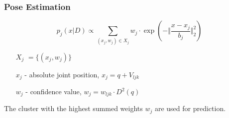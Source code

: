 \documentclass[xcolor=dvipsnames]{beamer}
\begin{document}
\begin{frame}
	\frametitle{Pose Estimation}

	\begin{equation*}
		p_j(x | D) \propto \sum\limits_{(x_j, w_j) \in X_j}^{} w_{j} \cdot \exp(- \Vert \frac{x - x_j}{b_j} \Vert^2_2)
	\end{equation*}
	
	\vspace{1cm}

	\begin{itemize}
		\item[$X_j$]$= \{(x_j, w_j)\}$
		\item[]
		\item[$x_j$ - ] absolute joint position, $x_j = q + V_{ljk}$
		\item[$w_j$ - ] confidence value, $w_j = w_{ljk} \cdot D^2(q)$
	\end{itemize}
	
	\vspace{0.5cm}
	
	The cluster with the highest summed weights $w_j$ are used for prediction.
\end{frame}
\end{document}
